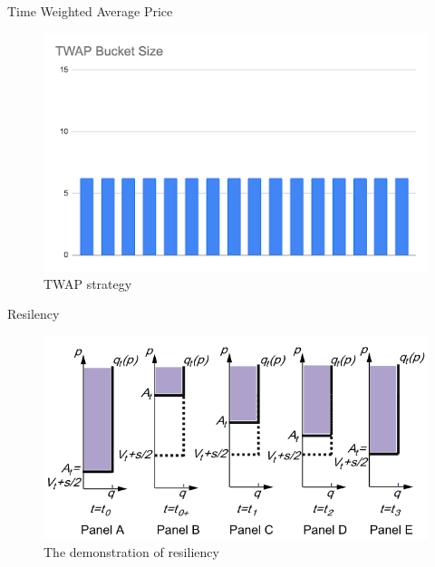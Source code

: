 \documentclass[aspectratio=169]{beamer}
\begin{document}
\begin{frame}{Time Weighted Average Price}
    \begin{figure}
        \includegraphics[scale=0.55]{figs/TWAP_Order_Type.png}
        \caption{TWAP strategy}
        \label{fig:mvslim}
    \end{figure}


\end{frame}


\begin{frame}{Resilency}
    \begin{figure}
        \includegraphics[scale=0.45]{figs/OWpicture.png}
        \caption{The demonstration of resiliency}
        \label{fig:mvslim}
    \end{figure}

\end{frame}
\end{document}
